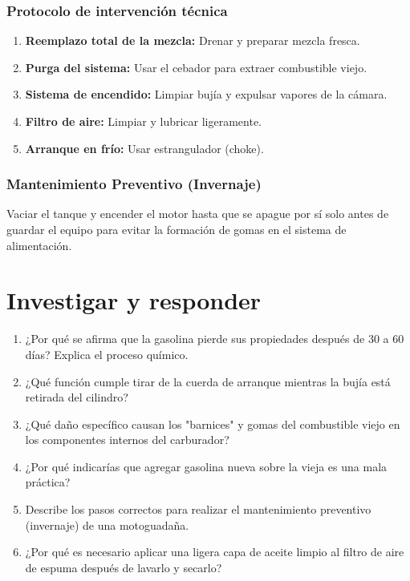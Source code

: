 \subsubsection*{Protocolo de intervención técnica}
\begin{enumerate}
  \item \textbf{Reemplazo total de la mezcla:} Drenar y preparar mezcla fresca.
  \item \textbf{Purga del sistema:} Usar el cebador para extraer combustible
    viejo.
  \item \textbf{Sistema de encendido:} Limpiar bujía y expulsar vapores de la
    cámara.
  \item \textbf{Filtro de aire:} Limpiar y lubricar ligeramente.
  \item \textbf{Arranque en frío:} Usar estrangulador (choke).
\end{enumerate}

\subsubsection*{Mantenimiento Preventivo (Invernaje)}
Vaciar el tanque y encender el motor hasta que se apague por sí solo antes de
guardar el equipo para evitar la formación de gomas en el sistema de
alimentación.

\section*{\faPencil\space Investigar y responder}
\begin{enumerate}
  \item ¿Por qué se afirma que la gasolina pierde sus propiedades después de
    30 a 60 días? Explica el proceso químico.
  \item ¿Qué función cumple tirar de la cuerda de arranque mientras la bujía
    está retirada del cilindro?
  \item ¿Qué daño específico causan los "barnices" y gomas del combustible viejo
    en los componentes internos del carburador?
  \item ¿Por qué indicarías que agregar gasolina nueva sobre la vieja
    es una mala
    práctica?
  \item Describe los pasos correctos para realizar el mantenimiento preventivo
    (invernaje) de una motoguadaña.
  \item ¿Por qué es necesario aplicar una ligera capa de aceite limpio al filtro
    de aire de espuma después de lavarlo y secarlo?
\end{enumerate}

